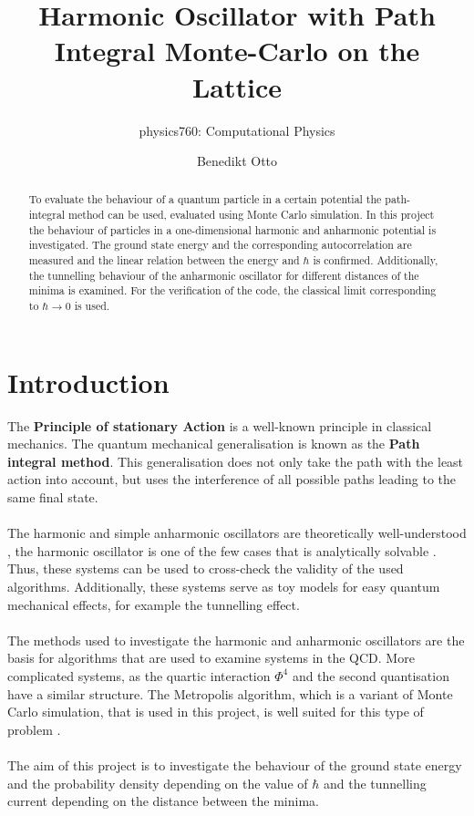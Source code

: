 \documentclass{scrartcl}
\title{Harmonic Oscillator with Path Integral Monte-Carlo on the Lattice}
\author{Benedikt Otto}
\subtitle{physics760: Computational Physics}
\begin{document}
	\maketitle

	\newpage

	\tableofcontents

	\newpage

	\begin{abstract}
		To evaluate the behaviour of a quantum particle in a certain potential the path-integral method can be used, evaluated using Monte Carlo simulation.
		In this project the behaviour of particles in a one-dimensional harmonic and anharmonic potential is investigated.
		The ground state energy and the corresponding autocorrelation are measured and the linear relation between the energy and $\hbar$ is confirmed.
		Additionally, the tunnelling behaviour of the anharmonic oscillator for different distances of the minima is examined.
		For the verification of the code, the classical limit corresponding to $\hbar \rightarrow 0$ is used.
	\end{abstract}

	\section{Introduction}
		The \textbf{Principle of stationary Action} is a well-known principle in classical mechanics.
		The quantum mechanical generalisation is known as the \textbf{Path integral method}.
		This generalisation does not only take the path with the least action into account, but uses the interference of all possible paths leading to the same final state.
		\\\\
		The harmonic and simple anharmonic oscillators are theoretically well-understood \cite{bender}, the harmonic oscillator is one of the few cases that is analytically solvable \cite{rushka_freericks}.
		Thus, these systems can be used to cross-check the validity of the used algorithms.
		Additionally, these systems serve as toy models for easy quantum mechanical effects, for example the tunnelling effect.
		\\\\
		The methods used to investigate the harmonic and anharmonic oscillators are the basis for algorithms that are used to examine systems in the QCD.
		More complicated systems, as the quartic interaction $\Phi^4$ and the second quantisation have a similar structure.
		The Metropolis algorithm, which is a variant of Monte Carlo simulation, that is used in this project, is well suited for this type of problem \cite{creutz_freedman, rodgers_raes}.
		\\\\
		The aim of this project is to investigate the behaviour of the ground state energy and the probability density depending on the value of $\hbar$ and the tunnelling current depending on the distance between the minima.
\end{document}
